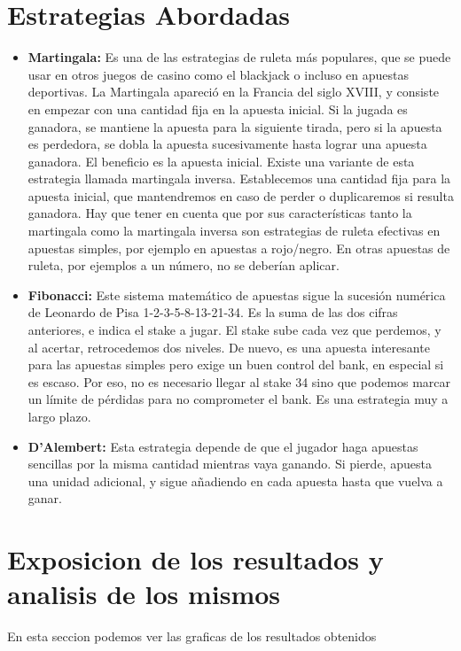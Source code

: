 \documentclass[onecolumn]{article}
\begin{document}
\section{Estrategias Abordadas}
\begin{itemize}
\item \textbf{Martingala:} Es una de las estrategias de ruleta más populares, que se puede usar en otros juegos de casino como el blackjack o incluso en apuestas deportivas. La Martingala apareció en la Francia del siglo XVIII, y consiste en empezar con una cantidad fija en la apuesta inicial. Si la jugada es ganadora, se mantiene la apuesta para la siguiente tirada, pero si la apuesta es perdedora, se dobla la apuesta sucesivamente hasta lograr una apuesta ganadora. El beneficio es la apuesta inicial. Existe una variante de esta estrategia llamada martingala inversa. Establecemos una cantidad fija para la apuesta inicial, que mantendremos en caso de perder o duplicaremos si resulta ganadora. Hay que tener en cuenta que por sus características tanto la martingala como la martingala inversa son estrategias de ruleta efectivas en apuestas simples, por ejemplo en apuestas a rojo/negro. En otras apuestas de ruleta, por ejemplos a un número, no se deberían aplicar.\\[2.0ex]
\item \textbf{Fibonacci:} Este sistema matemático de apuestas sigue la sucesión numérica de Leonardo de Pisa 1-2-3-5-8-13-21-34. Es la suma de las dos cifras anteriores, e indica el stake a jugar. El stake sube cada vez que perdemos, y al acertar, retrocedemos dos niveles. De nuevo, es una apuesta interesante para las apuestas simples pero exige un buen control del bank, en especial si es escaso. Por eso, no es necesario llegar al stake 34 sino que podemos marcar un límite de pérdidas para no comprometer el bank. Es una estrategia muy a largo plazo.\\[2.0ex]
\item \textbf{D’Alembert:} Esta estrategia depende de que el jugador haga apuestas sencillas por la misma cantidad mientras vaya ganando. Si pierde, apuesta una unidad adicional, y sigue añadiendo en cada apuesta hasta que vuelva a ganar.\\[2.0ex]
\end{itemize}

\section{Exposicion de los resultados y analisis de los mismos}
\normalsize En esta seccion podemos ver las graficas de los resultados obtenidos \\[2ex]
\end{document}
